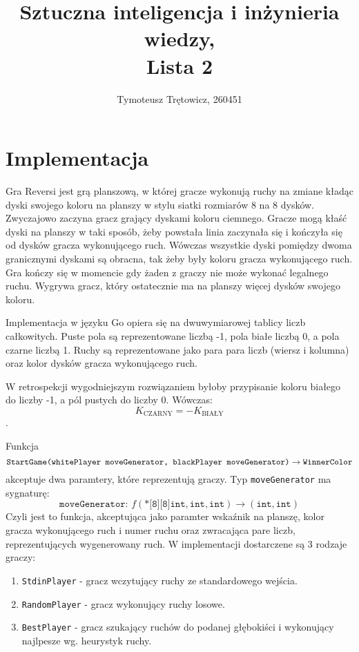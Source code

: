 \documentclass{article}
\title{Sztuczna inteligencja i inżynieria wiedzy, \\ Lista 2}
\author{Tymoteusz Trętowicz, 260451}
\date{}
\begin{document}
\maketitle
\pagebreak
\section{Implementacja}
Gra Reversi jest grą planszową, w której gracze wykonują ruchy na zmiane kładąc dyski swojego koloru na planszy w stylu siatki rozmiarów 8 na 8 dysków. Zwyczajowo zaczyna gracz grający dyskami koloru ciemnego. Gracze mogą kłaść dyski na planszy w taki sposób, żeby powstała linia zaczynała się i kończyła się od dysków gracza wykonującego ruch. Wówczas wszystkie dyski pomiędzy dwoma granicznymi dyskami są obracna, tak żeby były koloru gracza wykonującego ruch. Gra kończy się w momencie gdy żaden z graczy nie może wykonać legalnego ruchu. Wygrywa gracz, który ostatecznie ma na planszy więcej dysków swojego koloru.

Implementacja w języku Go opiera się na dwuwymiarowej tablicy liczb całkowitych. Puste pola są reprezentowane liczbą -1, pola białe liczbą 0, a pola czarne liczbą 1. Ruchy są reprezentowane jako para para liczb (wiersz i kolumna) oraz kolor dysków gracza wykonującego ruch.

W retrospekcji wygodniejszym rozwiązaniem byłoby przypisanie koloru białego do liczby -1, a pól pustych do liczby 0. Wówczas: $$K_{\text{CZARNY}} = -K_{\text{BIAŁY}}$$.

Funkcja
$$\text{\texttt{StartGame(whitePlayer moveGenerator, blackPlayer moveGenerator)}} \rightarrow \text{\texttt{WinnerColor}}$$
akceptuje dwa paramtery, które reprezentują graczy. Typ \texttt{moveGenerator} ma sygnaturę:
$$ \texttt{moveGenerator: } f(\texttt{*[8][8]int}, \texttt{int}, \texttt{int}) \rightarrow (\texttt{int}, \texttt{int})$$
Czyli jest to funkcja, akceptująca jako paramter wskaźnik na planszę, kolor gracza wykonującego ruch i numer ruchu oraz zwracająca pare liczb, reprezentujących wygenerowany ruch. W implementacji dostarczene są 3 rodzaje graczy: \begin{enumerate}
    \item \texttt{StdinPlayer} - gracz wczytujący ruchy ze standardowego wejścia.
    \item \texttt{RandomPlayer} - gracz wykonujący ruchy losowe.
    \item \texttt{BestPlayer} - gracz szukający ruchów do podanej głębokiści i wykonujący najlpesze wg. heurystyk ruchy.
\end{enumerate}
\end{document}

